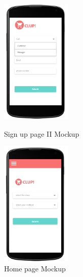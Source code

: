 \begin{figure}[H]
  \centering
  \includegraphics[width=0.3\textwidth,keepaspectratio]{images/8.png}
  \caption{Sign up page II Mockup}
  \centering
  \includegraphics[width=0.3\textwidth,keepaspectratio]{images/9.png}
  \caption{Home page Mockup}
\end{figure}
